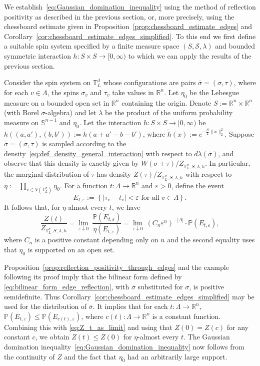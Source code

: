 \documentclass[12pt,reqno]{article}
\def\R{\mathbb{R}}
\def\T{\mathbb{T}}
\def\cS{\mathcal{S}}
\renewcommand{\S}{\mathbb{S}}
\def\eps{\varepsilon}
\renewcommand{\Pr}{\mathbb{P}}
\begin{document}
We establish~\eqref{eq:Gaussian_domination_inequality} using the method of reflection positivity as
described in the previous section, or, more precisely, using the chessboard estimate given in Proposition~\ref{prop:chessboard_estimate_edges} and Corollary~\ref{cor:chessboard_estimate_edges_simplified}. To this end we first define a suitable spin system specified by a finite measure space $(S,\cS, \lambda)$ and bounded symmetric interaction $h \colon S \times S \to [0,\infty)$ to which we can apply the results of the previous section.

Consider the spin system on $\T_L^d$ whose configurations are pairs $\bar{\sigma} = (\sigma,\tau)$, where for each $v \in \Lambda$, the spins $\sigma_v$ and $\tau_v$ take values in $\R^n$. Let $\eta_0$ be the Lebesgue measure on a bounded open set in $\R^n$ containing the origin. Denote $S := \R^n \times \R^n$ (with Borel $\sigma$-algebra) and let $\lambda$ be the product of the uniform probability measure on $\S^{n-1}$ and $\eta_0$. Let the interaction $h \colon S \times S \to [0,\infty)$ be $h((a,a'),(b,b')) := \tilde{h}(a+a'-b-b')$, where $\tilde{h}(x) := e^{-\frac{\beta}{2}\|x\|_2^2}$. Suppose $\bar{\sigma}=(\sigma,\tau)$ is sampled according to the density~\eqref{eq:def_density_general_interaction} with respect to $d\lambda(\bar{\sigma})$, and observe that this density is exactly given by $W(\sigma+\tau)/Z_{\T_L^d,S,\lambda,h}$. In particular, the marginal distribution of $\tau$ has density $Z(\tau)/Z_{\T_L^d,S,\lambda,h}$ with respect to $\eta := \prod_{v \in V(\T_L^d)} \eta_0$. For a function $t \colon \Lambda \to \R^n$ and $\eps>0$, define the event
\[ E_{t,\eps} := \left\{ |\tau_v - t_v| < \eps\text{ for all }v \in \Lambda \right\} .\]
It follows that, for $\eta$-almost every $t$, we have
\begin{equation}\label{eq:Z_t_as_limit}
 \frac{Z(t)}{Z_{\T_L^d,S,\lambda,h}} = \lim_{\eps \downarrow 0} ~ \frac{\Pr(E_{t,\eps})}{\eta(E_{t,\eps})} = \lim_{\eps \downarrow 0} ~ (C_n\eps^n)^{-|\Lambda|} \cdot \Pr(E_{t,\eps}) ,
\end{equation}
where $C_n$ is a positive constant depending only on $n$ and the second equality uses that $\eta_0$ is supported on an open set.

Proposition~\ref{prop:reflection_positivity_through_edges} and the example following its proof imply that the bilinear form defined by \eqref{eq:bilinear_form_edge_reflection}, with $\bar{\sigma}$ substituted for $\sigma$, is positive semidefinite. Thus Corollary~\ref{cor:chessboard_estimate_edges_simplified} may be used for the distribution of $\bar{\sigma}$. It implies that for each $t \colon \Lambda \to \R^n$, $\Pr(E_{t,\eps})\le \Pr(E_{c(t),\eps})$, where $c(t):\Lambda\to\R^n$ is a constant function. Combining this with \eqref{eq:Z_t_as_limit} and using that $Z(0)=Z(c)$ for any constant $c$, we obtain $Z(t) \le Z(0)$ for $\eta$-almost every $t$. The Gaussian domination inequality~\eqref{eq:Gaussian_domination_inequality} now follows from the continuity of $Z$ and the fact that $\eta_0$ had an arbitrarily large support.
\end{document}
